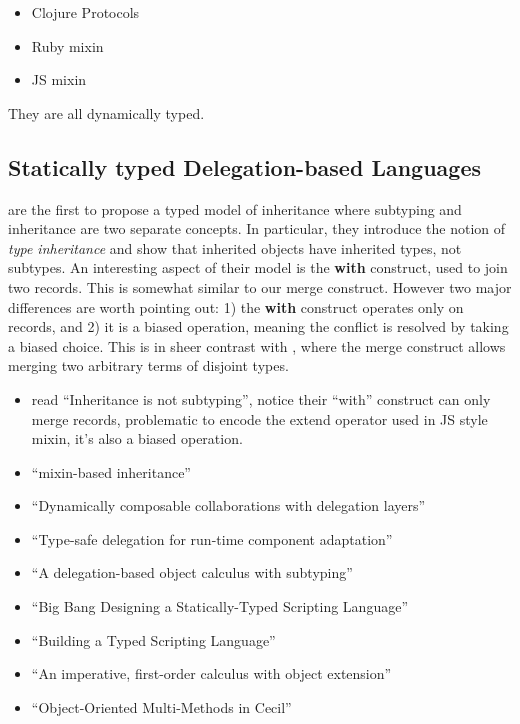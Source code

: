 \begin{itemize}
\item Clojure Protocols
\item Ruby mixin
\item JS mixin
\end{itemize}

They are all dynamically typed.

\subsection{Statically typed Delegation-based Languages}

\citet{cook1989inheritance} are the first to propose a typed model of
inheritance where subtyping and inheritance are two separate concepts. In
particular, they introduce the notion of \textit{type inheritance} and show that
inherited objects have inherited types, not subtypes. An interesting aspect of
their model is the \textbf{with} construct, used to join two records. This is
somewhat similar to our merge construct. However two major differences are worth
pointing out: 1) the \textbf{with} construct operates only on records, and 2) it
is a biased operation, meaning the conflict is resolved by taking a biased
choice. This is in sheer contrast with \name, where the merge construct allows
merging two arbitrary terms of disjoint types. 






\begin{itemize}
\item read ``Inheritance is not subtyping'', notice their ``with'' construct can
  only merge records, problematic to encode the extend operator used in JS style
  mixin, it's also a biased operation.

\item ``mixin-based inheritance''

\item ``Dynamically composable collaborations with delegation layers''

\item ``Type-safe delegation for run-time component adaptation''

\item ``A delegation-based object calculus with subtyping''

\item ``Big Bang Designing a Statically-Typed Scripting Language''

\item ``Building a Typed Scripting Language''

\item ``An imperative, first-order calculus with object extension''

\item ``Object-Oriented Multi-Methods in Cecil''

\end{itemize}

